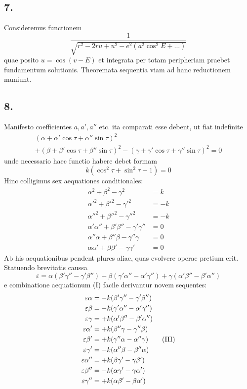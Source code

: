 \documentclass[12pt,a4paper]{article}
\theoremstyle{plain}
\begin{document}
\subsection*{7.}

Consideremus functionem
\[
\frac{1}{\sqrt{r^2 - 2ru + u^2 - e^2(a^2\cos^2 E + \ldots)}}
\]
quae posito $u = \cos(v-E)$ et integrata per totam peripheriam praebet fundamentum solutionis. Theoremata sequentia viam ad hanc reductionem muniunt.

\subsection*{8.}

Manifesto coefficientes $a, a', a''$ etc. ita comparati esse debent, ut fiat indefinite
\begin{multline*}
(\alpha + \alpha'\cos\tau + \alpha''\sin\tau)^2\\
+ (\beta + \beta'\cos\tau + \beta''\sin\tau)^2 - (\gamma + \gamma'\cos\tau + \gamma''\sin\tau)^2 = 0
\end{multline*}
unde necessario haec functio habere debet formam
\[
k(\cos^2\tau + \sin^2\tau - 1) = 0
\]
Hinc colligimus sex aequationes conditionales:
\begin{align}
\alpha^2 + \beta^2 - \gamma^2 &= k \tag{I}\\
\alpha'^2 + \beta'^2 - \gamma'^2 &= -k\\
\alpha''^2 + \beta''^2 - \gamma''^2 &= -k\\
\alpha'\alpha'' + \beta'\beta'' - \gamma'\gamma'' &= 0\\
\alpha''\alpha + \beta''\beta - \gamma''\gamma &= 0\\
\alpha\alpha' + \beta\beta' - \gamma\gamma' &= 0
\end{align}
Ab his aequationibus pendent plures aliae, quas evolvere operae pretium erit. Statuendo brevitatis caussa
\[
\varepsilon = \alpha(\beta'\gamma'' - \gamma'\beta'') + \beta(\gamma'\alpha'' - \alpha'\gamma'') + \gamma(\alpha'\beta'' - \beta'\alpha'')
\]
e combinatione aequationum (I) facile derivantur novem sequentes:
\begin{align}
\varepsilon\alpha &= -k(\beta'\gamma'' - \gamma'\beta'') \notag\\
\varepsilon\beta &= -k(\gamma'\alpha'' - \alpha'\gamma'') \notag\\
\varepsilon\gamma &= +k(\alpha'\beta'' - \beta'\alpha'') \notag\\
\varepsilon\alpha' &= +k(\beta''\gamma - \gamma''\beta) \notag\\
\varepsilon\beta' &= +k(\gamma''\alpha - \alpha''\gamma) \tag{III}\\
\varepsilon\gamma' &= -k(\alpha''\beta - \beta''\alpha) \notag\\
\varepsilon\alpha'' &= +k(\beta\gamma' - \gamma\beta') \notag\\
\varepsilon\beta'' &= -k(\alpha\gamma' - \gamma\alpha') \notag\\
\varepsilon\gamma'' &= +k(\alpha\beta' - \beta\alpha') \notag
\end{align}
\end{document}
